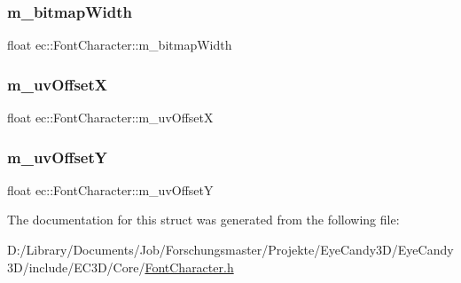\subsubsection{\texorpdfstring{m\+\_\+bitmap\+Width}{m\_bitmapWidth}}
{\footnotesize\ttfamily float ec\+::\+Font\+Character\+::m\+\_\+bitmap\+Width}

\mbox{\label{structec_1_1_font_character_a13e3f7cbc190b61581c6909bff262133}} 
\subsubsection{\texorpdfstring{m\+\_\+uv\+OffsetX}{m\_uvOffsetX}}
{\footnotesize\ttfamily float ec\+::\+Font\+Character\+::m\+\_\+uv\+OffsetX}

\mbox{\label{structec_1_1_font_character_ac48d060931b82412610d9749b1374db3}} 
\subsubsection{\texorpdfstring{m\+\_\+uv\+OffsetY}{m\_uvOffsetY}}
{\footnotesize\ttfamily float ec\+::\+Font\+Character\+::m\+\_\+uv\+OffsetY}



The documentation for this struct was generated from the following file\+:\begin{DoxyCompactItemize}
\item 
D\+:/\+Library/\+Documents/\+Job/\+Forschungsmaster/\+Projekte/\+Eye\+Candy3\+D/\+Eye\+Candy3\+D/include/\+E\+C3\+D/\+Core/\mbox{\hyperlink{_font_character_8h}{Font\+Character.\+h}}\end{DoxyCompactItemize}
